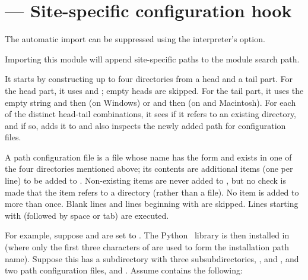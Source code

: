 \section{ ---
         Site-specific configuration hook}



The automatic import can be suppressed using the interpreter's
 option.

Importing this module will append site-specific paths to the module
search path.

It starts by constructing up to four directories from a head and a
tail part.  For the head part, it uses  and
; empty heads are skipped.  For
the tail part, it uses the empty string and then
 (on Windows) or
 and then
 (on \UNIX{} and Macintosh).  For each of the
distinct head-tail combinations, it sees if it refers to an existing
directory, and if so, adds it to  and also inspects
the newly added path for configuration files.

A path configuration file is a file whose name has the form
 and exists in one of the four directories
mentioned above; its contents are additional items (one per line) to
be added to .  Non-existing items are never added to
, but no check is made that the item refers to a
directory (rather than a file).  No item is added to 
more than once.  Blank lines and lines beginning with \code{\#} are
skipped.  Lines starting with  (followed by space or tab)
are executed.



For example, suppose  and  are
set to .  The Python \version\ library is then
installed in  (where only the
first three characters of  are used to form the
installation path name).  Suppose this has a subdirectory
 with three
subsubdirectories, ,  and , and two
path configuration files,  and .  Assume
 contains the following:


